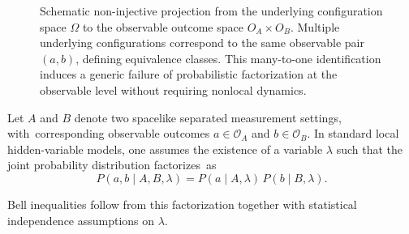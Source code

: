 \documentclass[quantumrep,article,accept,pdftex,oneauthor]{Definitions/mdpi}
\theoremstyle{remark}
\begin{document}
\begin{figure}[H]
      \caption{Schematic non-injective projection from the underlying configuration space
        $\Omega$ to the observable outcome space $O_A \times O_B$.
        Multiple underlying configurations correspond to the same observable pair $(a,b)$,
        defining equivalence classes.
        This many-to-one identification induces a generic failure of probabilistic factorization
        at the observable level without requiring nonlocal dynamics.}
      \label{fig:non-injective-projection}
    \end{figure}

    Let $A$ and $B$ denote two spacelike separated measurement settings, with~corresponding
    observable outcomes $a \in \mathcal{O}_A$ and $b \in \mathcal{O}_B$.
    In standard local hidden-variable models, one assumes the existence of a variable
    $\lambda$ such that the joint probability distribution factorizes~as
\begin{equation}
      P(a,b \mid A,B,\lambda) = P(a \mid A,\lambda)\,P(b \mid B,\lambda).
    \end{equation}

    Bell inequalities follow from this factorization together with statistical independence
    assumptions on $\lambda$.
\end{document}

